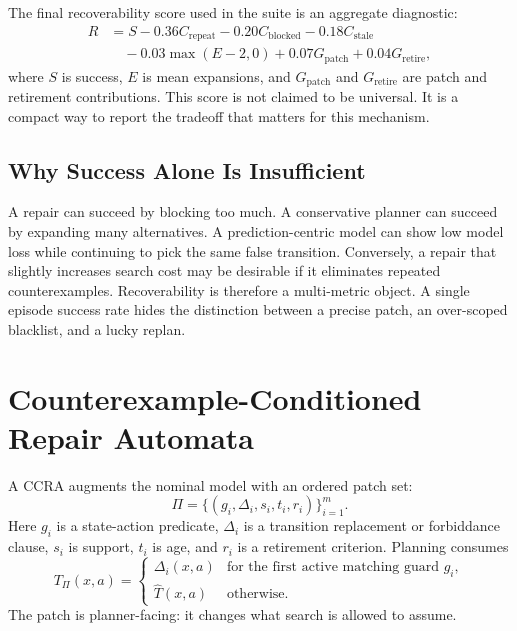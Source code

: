 \documentclass{article}
\newcommand{\ccra}{\textsc{CCRA}}
\newcommand{\guard}{g}
\newcommand{\patch}{\Delta}
\newcommand{\model}{\hat{T}}
\newcommand{\patched}{T_{\Pi}}
\begin{document}
The final recoverability score used in the suite is an aggregate diagnostic:
\begin{equation}
\begin{split}
R &= S - 0.36 C_{\mathrm{repeat}} - 0.20 C_{\mathrm{blocked}}
     - 0.18 C_{\mathrm{stale}} \\
  &\quad - 0.03 \max(E-2,0) + 0.07 G_{\mathrm{patch}} +
     0.04 G_{\mathrm{retire}},
\end{split}
\end{equation}
where $S$ is success, $E$ is mean expansions, and $G_{\mathrm{patch}}$ and
$G_{\mathrm{retire}}$ are patch and retirement contributions. This score is not
claimed to be universal. It is a compact way to report the tradeoff that matters
for this mechanism.

\subsection{Why Success Alone Is Insufficient}

A repair can succeed by blocking too much. A conservative planner can succeed by
expanding many alternatives. A prediction-centric model can show low model loss
while continuing to pick the same false transition. Conversely, a repair that
slightly increases search cost may be desirable if it eliminates repeated
counterexamples. Recoverability is therefore a multi-metric object. A single
episode success rate hides the distinction between a precise patch, an
over-scoped blacklist, and a lucky replan.

\section{Counterexample-Conditioned Repair Automata}

A \ccra{} augments the nominal model with an ordered patch set:
\begin{equation}
    \Pi = \{(\guard_i, \patch_i, s_i, t_i, r_i)\}_{i=1}^m.
\end{equation}
Here $\guard_i$ is a state-action predicate, $\patch_i$ is a transition
replacement or forbiddance clause, $s_i$ is support, $t_i$ is age, and $r_i$ is
a retirement criterion. Planning consumes
\begin{equation}
  \patched(x,a) =
  \begin{cases}
    \patch_i(x,a) & \text{for the first active matching guard } \guard_i,\\
    \model(x,a) & \text{otherwise.}
  \end{cases}
\end{equation}
The patch is planner-facing: it changes what search is allowed to assume.
\end{document}
